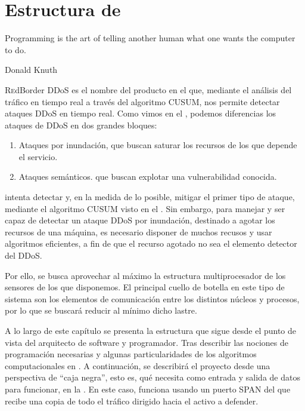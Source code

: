\chapter{Estructura de \redborderddos}
\pagestyle{esitscCD}
\epigraph{Programming is the art of telling another human what one wants the computer to do.}{Donald Knuth}

\lettrine[lraise=-0.1, lines=2, loversize=0.25]{R}edBorder DDoS es el nombre del producto en el 
que, mediante el análisis del tráfico en tiempo real a través del algoritmo \gls{CUSUM}, nos permite detectar ataques 
\gls{DDoS} en tiempo real. Como vimos en el , podemos diferencias los ataques de 
\gls{DDoS} en dos grandes bloques: 
\begin{enumerate}
 \item Ataques por inundación, que buscan saturar los recursos de los que depende el servicio.
 \item Ataques semánticos. que buscan explotar una vulnerabilidad conocida.
\end{enumerate}

\redborderddos{} intenta detectar y, en la medida de lo posible, mitigar el primer tipo de ataque, mediante el 
algoritmo \gls{CUSUM} visto en el . Sin embargo, para manejar y ser capaz de detectar un ataque 
\gls{DDoS} por inundación, destinado a agotar los recursos de una máquina, es necesario disponer de muchos recusos y 
usar algoritmos eficientes, a fin de que el recurso agotado no sea el elemento detector del \gls{DDoS}.

Por ello, se busca aprovechar al máximo la estructura multiprocesador de los sensores de los que disponemos. El 
principal cuello de botella en este tipo de sistema son los elementos de comunicación entre los distintos núcleos y 
procesos, por lo que se buscará reducir al mínimo dicho lastre.

A lo largo de este capítulo se presenta la estructura que sigue \redborderddos{} desde el punto de vista del arquitecto 
de software y programador. Tras describir las nociones de programación necesarias y algunas particularidades de los 
algoritmos computacionales en . A continuación, se describirá el proyecto desde una perspectiva de 
``caja negra'', esto es, qué necesita como entrada y salida de datos para funcionar, en la . En este 
caso, \redborderddos{} funciona usando un puerto SPAN del que recibe una copia de todo el tráfico dirigido hacia el 
activo a defender.

